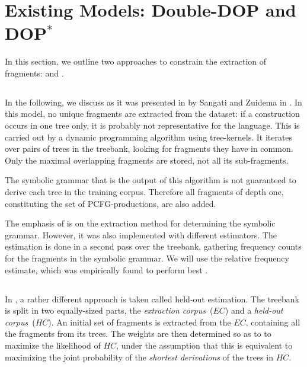 
\section{Existing Models: Double-DOP and DOP$^*$}\label{sec:Existing}


In this section, we outline two approaches to constrain the extraction of fragments: \ddop{} and \dops{}. 

\subsection{\ddop}
In the following, we discuss \ddop{} as it was presented in by Sangati and Zuidema in . In this model, no unique fragments are extracted from the dataset: if a construction occurs in one tree only, it is probably not representative for the language. This is carried out by a dynamic programming algorithm using tree-kernels. It iterates over pairs of trees in the treebank, looking for fragments they have in common. Only the maximal overlapping fragments are stored, not all its sub-fragments.

The symbolic grammar that is the output of this algorithm is not guaranteed to derive each tree in the training corpus. Therefore all fragments of depth one, constituting the set of PCFG-productions, are also added.

The emphasis of \ddop{} is on the extraction method for determining the symbolic grammar. However, it was also implemented with different estimators. The estimation is done in a second pass over the treebank, gathering frequency counts for the fragments in the symbolic grammar. We will use the relative frequency estimate, which was empirically found to perform best \cite{sangati2011}.

\subsection{\dops}
In \dops{} \cite{zollmann2005}, a rather different approach is taken called held-out estimation. The treebank is split in two equally-sized parts, the \emph{extraction corpus}~($EC$) and a \emph{held-out corpus}~($HC$). An initial set of fragments is extracted from the $EC$, containing all the fragments from its trees. The weights are then determined so as to to maximize the likelihood of $HC$, under the assumption that this is equivalent to maximizing the joint probability of the \emph{shortest derivations} of the trees in $HC$. 

